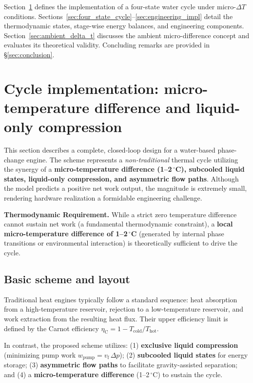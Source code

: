 \documentclass[11pt,a4paper]{article}
\begin{document}
Section~\ref{sec:liquid_only} defines the 
implementation of a four-state water cycle under micro-$\Delta T$ 
conditions. Sections~\ref{sec:four_state_cycle}--\ref{sec:engineering_impl} 
detail the thermodynamic states, stage-wise energy balances, and 
engineering components. Section~\ref{sec:ambient_delta_t} discusses the 
ambient micro-difference concept and evaluates its theoretical validity. 
Concluding remarks are provided in \S\ref{sec:conclusion}.

\section{Cycle implementation: micro-temperature difference and liquid-only compression}
\label{sec:liquid_only}

This section describes a complete, closed-loop design for a water-based 
phase-change engine. The scheme represents a \emph{non-traditional} 
thermal cycle utilizing the synergy of a \textbf{micro-temperature 
difference (1--2\,$^\circ$C), subcooled liquid states, liquid-only 
compression, and asymmetric flow paths}. Although the model predicts a 
positive net work output, the magnitude is extremely small, rendering hardware 
realization a formidable engineering challenge.

\textbf{Thermodynamic Requirement.} While a strict zero temperature 
difference cannot sustain net work (a fundamental thermodynamic constraint), 
a \textbf{local micro-temperature difference of 1--2\,$^\circ$C} 
(generated by internal phase transitions or environmental interaction) 
is theoretically sufficient to drive the cycle.

\subsection{Basic scheme and layout}

Traditional heat engines typically follow a standard sequence: heat 
absorption from a high-temperature reservoir, rejection to a 
low-temperature reservoir, and work extraction from the resulting heat 
flux. Their upper efficiency limit is defined by the Carnot efficiency 
$\eta_{\mathrm{C}} = 1 - T_{\mathrm{cold}}/T_{\mathrm{hot}}$.

In contrast, the proposed scheme utilizes: (1) \textbf{exclusive liquid 
compression} (minimizing pump work $w_{\mathrm{pump}} = v_{\mathrm{f}}\,\Delta p$); 
(2) \textbf{subcooled liquid states} for energy storage; (3) 
\textbf{asymmetric flow paths} to facilitate gravity-assisted separation; 
and (4) a \textbf{micro-temperature difference} (1--2\,$^\circ$C) 
to sustain the cycle.
\end{document}
